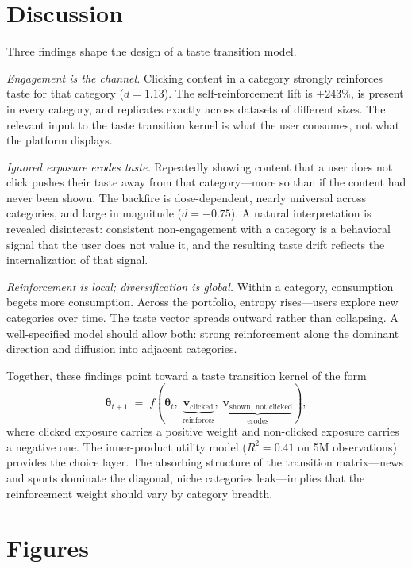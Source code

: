 \documentclass[11pt]{article}
\begin{document}
\section{Discussion}

Three findings shape the design of a taste transition model.

\textit{Engagement is the channel.} Clicking content in a category strongly reinforces taste for that category ($d = 1.13$). The self-reinforcement lift is $+243\%$, is present in every category, and replicates exactly across datasets of different sizes. The relevant input to the taste transition kernel is what the user consumes, not what the platform displays.

\textit{Ignored exposure erodes taste.} Repeatedly showing content that a user does not click pushes their taste away from that category---more so than if the content had never been shown. The backfire is dose-dependent, nearly universal across categories, and large in magnitude ($d = -0.75$). A natural interpretation is revealed disinterest: consistent non-engagement with a category is a behavioral signal that the user does not value it, and the resulting taste drift reflects the internalization of that signal.

\textit{Reinforcement is local; diversification is global.} Within a category, consumption begets more consumption. Across the portfolio, entropy rises---users explore new categories over time. The taste vector spreads outward rather than collapsing. A well-specified model should allow both: strong reinforcement along the dominant direction and diffusion into adjacent categories.

Together, these findings point toward a taste transition kernel of the form
\[
\boldsymbol{\theta}_{t+1} \;=\; f\!\left(\boldsymbol{\theta}_t,\; \underbrace{\mathbf{v}_{\text{clicked}}}_{\text{reinforces}},\; \underbrace{\mathbf{v}_{\text{shown, not clicked}}}_{\text{erodes}}\right),
\]
where clicked exposure carries a positive weight and non-clicked exposure carries a negative one. The inner-product utility model ($R^2 = 0.41$ on 5M observations) provides the choice layer. The absorbing structure of the transition matrix---news and sports dominate the diagonal, niche categories leak---implies that the reinforcement weight should vary by category breadth.

\section{Figures}
\end{document}
